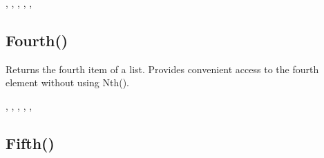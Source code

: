 \documentclass[letterpaper,10pt,english]{sphinxmanual}
\begin{document}
\sphinxAtStartPar
{}, , , , , 

\ignorespaces 

\subsection{Fourth()}
\label{\detokenize{reference/pebllist:fourth}}\label{\detokenize{reference/pebllist:index-14}}
\sphinxAtStartPar
{}

\sphinxAtStartPar
{}

\sphinxAtStartPar
Returns the fourth item of a list. Provides convenient access to the fourth element without using Nth().

\sphinxAtStartPar
{}

\begin{sphinxVerbatim}[commandchars=\\\{\}]
\end{sphinxVerbatim}

\sphinxAtStartPar
{}

\begin{sphinxVerbatim}[commandchars=\\\{\}]
\PYG{p}{[}\PYG{p}{]}
\end{sphinxVerbatim}

\sphinxAtStartPar
{}

\sphinxAtStartPar
{}, , , , , 

\ignorespaces 

\subsection{Fifth()}
\label{\detokenize{reference/pebllist:fifth}}\label{\detokenize{reference/pebllist:index-15}}
\sphinxAtStartPar
{}
\end{document}

